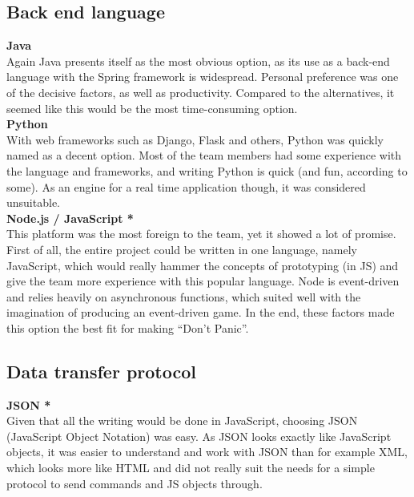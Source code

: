 \subsection{Back end language}
\textbf{Java}\\
Again Java presents itself as the most obvious option, as its use as a back-end language with the Spring framework is widespread. Personal preference was one of the decisive factors, as well as productivity. Compared to the alternatives, it seemed like this would be the most time-consuming option.
\\ \newline
\textbf{Python}\\
With web frameworks such as Django, Flask and others, Python was quickly named as a decent option. Most of the team members had some experience with the language and frameworks, and writing Python is quick (and fun, according to some). As an engine for a real time application though, it was considered unsuitable. 
\\ \newline
\textbf{Node.js / JavaScript *}\\
This platform was the most foreign to the team, yet it showed a lot of promise. First of all, the entire project could be written in one language, namely JavaScript, which would really hammer the concepts of prototyping (in JS) and give the team more experience with this popular language. Node is event-driven and relies heavily on asynchronous functions, which suited well with the imagination of producing an event-driven game. In the end, these factors made this option the best fit for making “Don’t Panic”.


\subsection{Data transfer protocol}
\textbf{JSON *}\\
Given that all the writing would be done in JavaScript, choosing JSON (JavaScript Object Notation) was easy. As JSON looks exactly like JavaScript objects, it was easier to understand and work with JSON than for example XML, which looks more like HTML and did not really suit the needs for a simple protocol to send commands and JS objects through.


